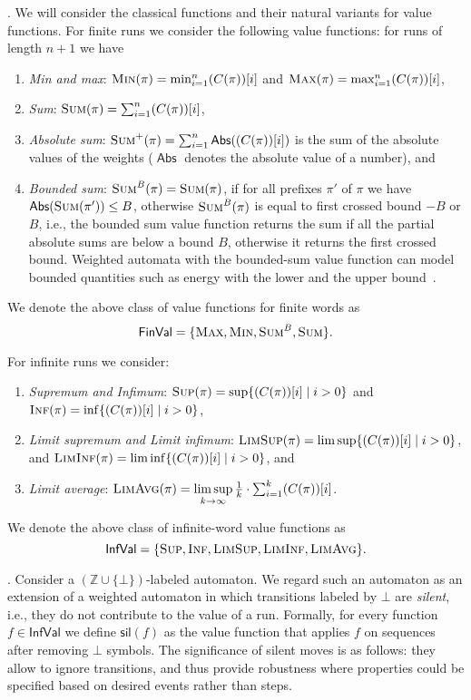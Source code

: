 \documentclass{lmcs}
\newcommand{\Paragraph}[1]{\noindent{\textbf{#1}}}
\newcommand{\silent}[1]{\mathsf{sil}({#1})}
\newcommand{\cost}{{C}}
\newcommand{\abs}{\mathop{\mathsf{Abs}}}
\newcommand{\Z}{\mathbb{Z}}
\newcommand{\fsum}{\textsc{Sum}}
\newcommand{\fBsum}[1]{\textsc{Sum}^{#1}}
\newcommand{\fmax}{\textsc{Max}}
\newcommand{\fmin}{\textsc{Min}}
\newcommand{\flimavg}{\textsc{LimAvg}}
\newcommand{\fliminf}{\textsc{LimInf}}
\newcommand{\flimsup}{\textsc{LimSup}}
\newcommand{\fsup}{\textsc{Sup}}
\newcommand{\finf}{\textsc{Inf}}
\newcommand{\FinVal}{\mathsf{FinVal}}
\newcommand{\InfVal}{\mathsf{InfVal}}
\begin{document}
\smallskip
\Paragraph{Value functions}.
We will consider the classical functions and their natural variants for
value functions.
For finite runs we consider the following value functions: for runs of length $n+1$ we have
\begin{enumerate}
\item \emph{Min and max}: $\fmin(\pi) = \min_{i=1}^n (\cost(\pi))[i]$ and $\fmax(\pi) = \max_{i=1}^n (\cost(\pi))[i]$,
\item \emph{Sum}: $\fsum(\pi) = \sum_{i=1}^{n} (\cost(\pi))[i]$,
\item \emph{Absolute sum}: $\fsum^+(\pi) = \sum_{i=1}^{n} \abs((\cost(\pi))[i])$
is the sum of the absolute values of the weights ($\abs$ denotes the
absolute value of a number),
and
\item \emph{Bounded sum}: $\fBsum{B}(\pi) = \fsum(\pi)$,
if for all prefixes $\pi'$ of $\pi$ we have $\abs(\fsum(\pi')) \leq B$,
otherwise $\fBsum{B}(\pi)$ is equal to first crossed bound $-B$ or $B$, i.e.,
the bounded sum value function returns the sum if all the
partial absolute sums are below a bound $B$, otherwise it returns the first crossed bound.
Weighted automata with the bounded-sum value function can model bounded quantities such as energy with the lower and the upper bound~\cite{DBLP:journals/acta/BouyerMRLL18}.
\end{enumerate}

\noindent
We denote the above class of value functions for finite words as
\[\FinVal=\{\fmax,\fmin,\fBsum{B},\fsum\}.\]

\noindent
For infinite runs we consider:
\begin{enumerate}
\item \emph{Supremum and Infimum}: $\fsup(\pi) = \sup \{ (\cost(\pi))[i] \mid i > 0 \}$ and
 $\finf(\pi) = \inf \{ (\cost(\pi))[i] \mid i > 0 \}$,
 \item \emph{Limit supremum and Limit infimum}:
 $\flimsup(\pi) = \lim\sup \{ (\cost(\pi))[i] \mid i > 0\}$, and
 $\fliminf(\pi) = \lim\inf \{  (\cost(\pi))[i] \mid i > 0 \}$, and
\item \emph{Limit average}: $\flimavg(\pi) = \limsup\limits_{k \rightarrow \infty} \frac{1}{k} \cdot \sum_{i=1}^{k} (\cost(\pi))[i]$.
\end{enumerate}

\noindent
We denote the above class of infinite-word value functions as
\[\InfVal=\{\fsup,\finf,\flimsup,\fliminf,\flimavg\}.\]

\smallskip
\Paragraph{Silent moves}. Consider a $(\Z \cup \{ \bot\})$-labeled automaton.
We regard such an automaton as an extension
of a weighted automaton in which transitions labeled by $\bot$ are \emph{silent}, i.e., they do not contribute to
the value of a run. Formally, for every function $f \in \InfVal$ we define
$\silent{f}$ as the value function that applies $f$ on sequences after removing $\bot$ symbols.
The significance of silent moves is as follows: they allow to ignore transitions, and thus provide
robustness where properties could be specified based on desired events rather than steps.
\end{document}
